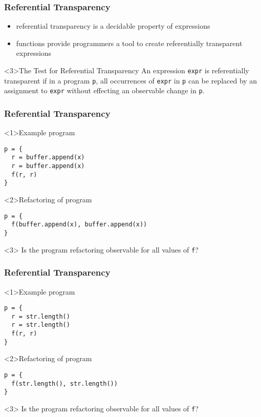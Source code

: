 \begin{frame}
\frametitle{Referential Transparency}
\begin{itemize}
  \item<1> referential transparency is a decidable property of expressions
  \item<2> functions provide programmers a tool to create referentially transparent expressions
\end{itemize}
\begin{block}<3>{The Test for Referential Transparency}
An expression \lstinline$expr$ is referentially transparent if in a program \lstinline$p$, all occurrences of \lstinline$expr$ in \lstinline$p$ can be replaced by an assignment to \lstinline$expr$ without effecting an observable change in \lstinline$p$.
\end{block}
\end{frame}

\begin{frame}[fragile]
\frametitle{Referential Transparency}
\begin{block}<1>{Example program}
\begin{lstlisting}
p = {
  r = buffer.append(x)
  r = buffer.append(x)
  f(r, r)
}
\end{lstlisting}
\end{block}
\begin{block}<2>{Refactoring of program}
\begin{lstlisting}
p = {
  f(buffer.append(x), buffer.append(x))
}
\end{lstlisting}
\end{block}
\begin{block}<3>{}
Is the program refactoring observable for all values of \lstinline$f$?
\end{block}
\end{frame}

\begin{frame}[fragile]
\frametitle{Referential Transparency}
\begin{block}<1>{Example program}
\begin{lstlisting}
p = {
  r = str.length()
  r = str.length()
  f(r, r)
}
\end{lstlisting}
\end{block}
\begin{block}<2>{Refactoring of program}
\begin{lstlisting}
p = {
  f(str.length(), str.length())
}
\end{lstlisting}
\end{block}
\begin{block}<3>{}
Is the program refactoring observable for all values of \lstinline$f$?
\end{block}
\end{frame}

